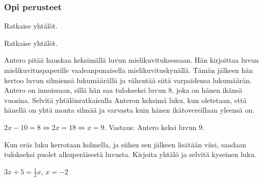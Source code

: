 \begin{tehtavasivu}

\subsubsection*{Opi perusteet}

\begin{tehtava}
    Ratkaise yhtälöt.
    \begin{vastaus}
    \end{vastaus}
\end{tehtava}

\begin{tehtava}
    Ratkaise yhtälöt.
    \begin{vastaus}
    \end{vastaus}
\end{tehtava}

\begin{tehtava}
    Antero pitää hauskaa keksimällä luvun mielikuvituksessaan. Hän kirjoittaa luvun mielikuvituspaperille vaaleanpunaisella mielikuvituskynällä. Tämän jälkeen hän kertoo luvun silmiensä lukumäärällä ja vähentää siitä varpaidensa lukumäärän. Antero on innoissaan, sillä hän saa tulokseksi luvun $8$, joka on hänen ikänsä vuosina. Selvitä yhtälönratkaisulla Anteron keksimä luku, kun oletetaan, että hänellä on yhtä monta silmää ja varvasta kuin hänen ikätovereillaan yleensä on.
    \begin{vastaus}
        $2x-10=8 \Leftrightarrow 2x=18 \Leftrightarrow x=9$. Vastaus: Antero keksi luvun $9$.
    \end{vastaus}
\end{tehtava}

\begin{tehtava}
    Kun eräs luku kerrotaan kolmella, ja siihen sen jälkeen lisätään viisi, saadaan tulokseksi puolet alkuperäisestä luvusta. Kirjoita yhtälö ja selvitä kyseinen luku.
    \begin{vastaus}
        $3x+5=\frac12x$, $x=-2$
    \end{vastaus}
\end{tehtava}


\end{tehtavasivu}
